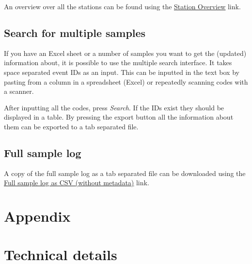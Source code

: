 \documentclass[a4paper,english, 11pt]{article}
\begin{document}
An overview over all the stations can be found using the \href{https://www.sios-svalbard.org/reports/aen_plot_all_stations}{\color{blue}\underline{Station Overview}} link.



\subsection{Search for multiple samples} %
\label{sub:search_multi}
If you have an Excel sheet or a number of samples you want to get the (updated) information about, it is possible to use the multiple search interface. It takes space separated event IDs as an input. This can be inputted in the text box by pasting from a column in a spreadsheet (Excel) or repeatedly scanning codes with a scanner. 

After inputting all the codes, press \emph{Search}. If the IDs exist they should be displayed in a table. By pressing the export button all the information about them can be exported to a tab separated file.

\subsection{Full sample log} %
\label{sub:Full sample log}
A copy of the full sample log as a tab separated file can be downloaded using the \newline \href{https://www.sios-svalbard.org/cgi-bin/export_search.cgi?&startdate=2018-01-01&enddate=3000-01-01&geartype=&sampletype=&cruisenumber=&parenteventid=&startlat=&startlon=&endlat=&endlon=&stationname=}{\color{blue}\underline{Full sample log as CSV (without metadata)}} link.





\clearpage
\newpage
\appendix
\section*{Appendix}

\section{Technical details} %
\label{sec:Technical details}
\end{document}
